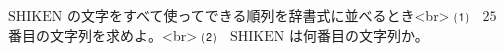 $\mathrm{SHIKEN}$ の文字をすべて使ってできる順列を辞書式に並べるとき<br>
⑴　$25$ 番目の文字列を求めよ。<br>
⑵　$\mathrm{SHIKEN}$ は何番目の文字列か。